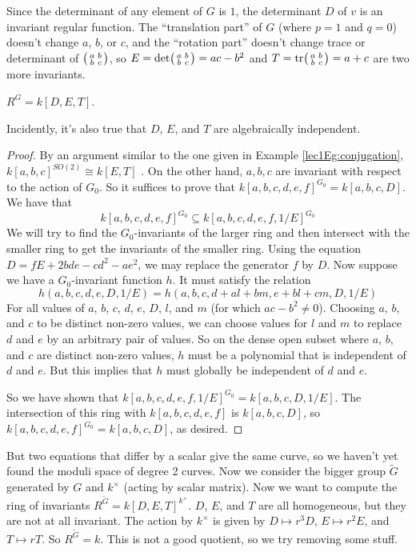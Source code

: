 Since the determinant of any element of $G$ is $1$, the determinant $D$ of $v$ is an invariant regular function. The ``translation part'' of $G$ (where $p=1$ and $q=0$) doesn't change $a$, $b$, or $c$, and the ``rotation part'' doesn't change trace or determinant of $\bigl(\begin{smallmatrix} a&b\\ b&c \end{smallmatrix}\bigr)$, so $E=\det\bigl(\begin{smallmatrix} a&b\\ b&c \end{smallmatrix}\bigr)=ac-b^2$ and $T=\mathrm{tr}\bigl(\begin{smallmatrix} a&b\\ b&c \end{smallmatrix}\bigr)=a+c$ are two more invariants.
\begin{proposition}
 $R^G=k[D,E,T]$.
\end{proposition}
Incidently, it's also true that $D$, $E$, and $T$ are algebraically independent.
\begin{proof}
 By an argument similar to the one given in Example \ref{lec1Eg:conjugation}, $k[a,b,c]^{SO(2)}\cong k[E,T]$ . On the other hand, $a,b,c$ are invariant with respect to the action of $G_0$. So it suffices to prove that $k[a,b,c,d,e,f]^{G_0}=k[a,b,c,D]$. We have that
 \[
  k[a,b,c,d,e,f]^{G_0}\subseteq k[a,b,c,d,e,f,1/E]^{G_0}
 \]
 We will try to find the $G_0$-invariants of the larger ring and then intersect with the smaller ring to get the invariants of the smaller ring. Using the equation $D=fE+2bde-cd^2-ae^2$, we may replace the generator $f$ by $D$. Now suppose we have a $G_0$-invariant function $h$. It must satisfy the relation
 \[
  h(a,b,c,d,e,D,1/E) = h(a,b,c,d+al+bm,e+bl+cm,D,1/E)
 \]
 For all values of $a$, $b$, $c$, $d$, $e$, $D$, $l$, and $m$ (for which $ac-b^2\neq 0$). Choosing $a$, $b$, and $c$ to be distinct non-zero values, we can choose values for $l$ and $m$ to replace $d$ and $e$ by an arbitrary pair of values. So on the dense open subset where $a$, $b$, and $c$ are distinct non-zero values, $h$ must be a polynomial that is independent of $d$ and $e$. But this implies that $h$ must globally be independent of $d$ and $e$. 

 So we have shown that $k[a,b,c,d,e,f,1/E]^{G_0}=k[a,b,c,D,1/E]$. The intersection of this ring with $k[a,b,c,d,e,f]$ is $k[a,b,c,D]$, so $k[a,b,c,d,e,f]^{G_0}=k[a,b,c,D]$, as desired.
\end{proof}
But two equations that differ by a scalar give the same curve, so we haven't yet found the moduli space of degree 2 curves. Now we consider the bigger group $\tilde G$ generated by $G$ and $k^\times$ (acting by scalar matrix). Now we want to compute the ring of invariants $R^{\tilde G} = k[D,E,T]^{k^\times}$. $D$, $E$, and $T$ are all homogeneous, but they are not at all invariant. The action by $k^\times$ is given by $D\mapsto r^3D$, $E\mapsto r^2E$, and $T\mapsto rT$. So $R^{\tilde G}=k$. This is not a good quotient, so we try removing some stuff.

